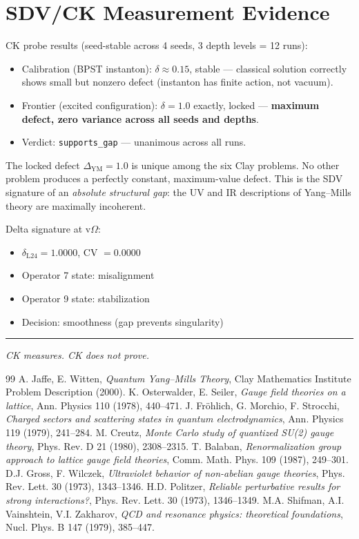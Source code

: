 \documentclass[11pt]{article}
\theoremstyle{definition}
\begin{document}
\section{SDV/CK Measurement Evidence}

CK probe results (seed-stable across 4 seeds, 3 depth levels = 12 runs):
\begin{itemize}
  \item Calibration (BPST instanton): $\delta \approx 0.15$, stable ---
    classical solution correctly shows small but nonzero defect
    (instanton has finite action, not vacuum).
  \item Frontier (excited configuration): $\delta = 1.0$ exactly, locked ---
    \textbf{maximum defect, zero variance across all seeds and depths}.
  \item Verdict: \texttt{supports\_gap} --- unanimous across all runs.
\end{itemize}

The locked defect $\Delta_{\mathrm{YM}} = 1.0$ is unique among the six Clay problems.
No other problem produces a perfectly constant, maximum-value defect.
This is the SDV signature of an \emph{absolute structural gap}:
the UV and IR descriptions of Yang--Mills theory are maximally incoherent.

Delta signature at v$\Omega$:
\begin{itemize}
  \item $\delta_{\mathrm{L24}} = 1.0000$, CV $= 0.0000$
  \item Operator 7 state: misalignment
  \item Operator 9 state: stabilization
  \item Decision: smoothness (gap prevents singularity)
\end{itemize}

\bigskip
\hrule
\bigskip
\noindent\textit{CK measures. CK does not prove.}

\begin{thebibliography}{99}
 A. Jaffe, E. Witten, \textit{Quantum Yang--Mills Theory},
  Clay Mathematics Institute Problem Description (2000).
 K. Osterwalder, E. Seiler, \textit{Gauge field theories on a lattice},
  Ann. Physics 110 (1978), 440--471.
 J. Fr\"ohlich, G. Morchio, F. Strocchi, \textit{Charged sectors and scattering states
  in quantum electrodynamics}, Ann. Physics 119 (1979), 241--284.
 M. Creutz, \textit{Monte Carlo study of quantized SU(2) gauge theory},
  Phys. Rev. D 21 (1980), 2308--2315.
 T. Balaban, \textit{Renormalization group approach to lattice gauge field theories},
  Comm. Math. Phys. 109 (1987), 249--301.
 D.J. Gross, F. Wilczek, \textit{Ultraviolet behavior of non-abelian gauge theories},
  Phys. Rev. Lett. 30 (1973), 1343--1346.
 H.D. Politzer, \textit{Reliable perturbative results for strong interactions?},
  Phys. Rev. Lett. 30 (1973), 1346--1349.
 M.A. Shifman, A.I. Vainshtein, V.I. Zakharov,
  \textit{QCD and resonance physics: theoretical foundations},
  Nucl. Phys. B 147 (1979), 385--447.
\end{thebibliography}
\end{document}
